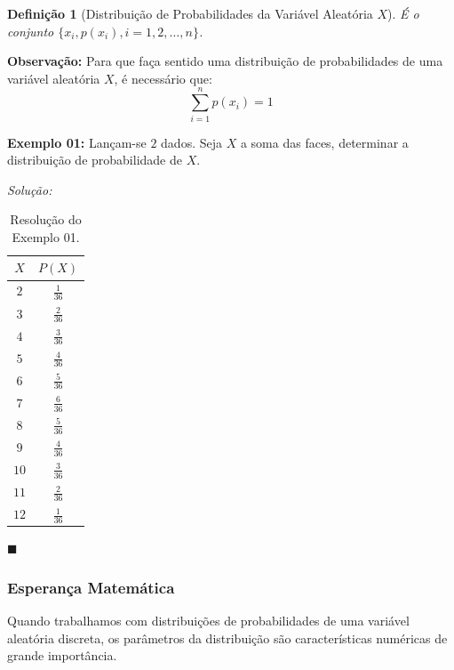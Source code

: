 \documentclass[oneside,a4paper,12pt]{article}
\newtheorem{definition}{Definição}[section]
\begin{document}
\begin{definition}[Distribuição de Probabilidades da Variável Aleatória $X$]
	É o conjunto $\{ x_i, p(x_i), i=1,2,\dots,n \}$.
\end{definition}

{\bf Observação:} Para que faça sentido uma distribuição de probabilidades de uma variável aleatória $X$, é necessário que:
$$\sum_{i=1}^{n}p(x_i) = 1$$

{\bf Exemplo 01:} Lançam-se $2$ dados. Seja $X$ a soma das faces, determinar a distribuição de probabilidade de $X$.

{\it Solução:}

\begin{table}[!h]
	\centering
\begin{tabular}{|c|c|}
	\hline
	$X$		&	$P(X)$ \\ \hline
	$2$		&	$\displaystyle \frac{1}{36}$	\\ \hline
	$3$		&	$\displaystyle \frac{2}{36}$	\\ \hline
	$4$		&	$\displaystyle \frac{3}{36}$	\\ \hline
	$5$		&	$\displaystyle \frac{4}{36}$	\\ \hline
	$6$		& 	$\displaystyle \frac{5}{36}$	\\ \hline
	$7$		&	$\displaystyle \frac{6}{36}$	\\ \hline
	$8$		&	$\displaystyle \frac{5}{36}$	\\ \hline
	$9$		&	$\displaystyle \frac{4}{36}$	\\ \hline
	$10$	&	$\displaystyle \frac{3}{36}$	\\ \hline
	$11$	&	$\displaystyle \frac{2}{36}$	\\ \hline
	$12$	&	$\displaystyle \frac{1}{36}$	\\ \hline
\end{tabular}
\caption{Resolução do Exemplo 01.}
\end{table}

\begin{flushright}
	$\blacksquare$
\end{flushright}



\subsubsection{Esperança Matemática}

Quando trabalhamos com distribuições de probabilidades de uma variável aleatória discreta, os parâmetros da distribuição são características numéricas de grande importância.
\end{document}
